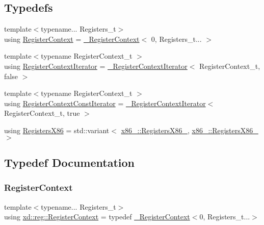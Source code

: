 \subsection*{Typedefs}
\begin{DoxyCompactItemize}
\item 
{\footnotesize template$<$typename... Registers\+\_\+t$>$ }\\using \mbox{\hyperlink{namespacexd_1_1reg_ab6608c02ef554f7a9a48519600fb6707}{Register\+Context}} = \mbox{\hyperlink{classxd_1_1reg_1_1___register_context}{\+\_\+\+Register\+Context}}$<$ 0, Registers\+\_\+t... $>$
\item 
{\footnotesize template$<$typename Register\+Context\+\_\+t $>$ }\\using \mbox{\hyperlink{namespacexd_1_1reg_a6cf4cf0ab5273eb69f6aa3fd40dcc1de}{Register\+Context\+Iterator}} = \mbox{\hyperlink{classxd_1_1reg_1_1___register_context_iterator}{\+\_\+\+Register\+Context\+Iterator}}$<$ Register\+Context\+\_\+t, false $>$
\item 
{\footnotesize template$<$typename Register\+Context\+\_\+t $>$ }\\using \mbox{\hyperlink{namespacexd_1_1reg_a2af91c639cf4f8e0907c20f2ac534965}{Register\+Context\+Const\+Iterator}} = \mbox{\hyperlink{classxd_1_1reg_1_1___register_context_iterator}{\+\_\+\+Register\+Context\+Iterator}}$<$ Register\+Context\+\_\+t, true $>$
\item 
using \mbox{\hyperlink{namespacexd_1_1reg_a0c10a4d10e689bc16f6f1a8feb4fb9b8}{Registers\+X86}} = std\+::variant$<$ \mbox{\hyperlink{namespacexd_1_1reg_1_1x86__32_a28d948c5cde56fbf4f6ea71cea3d595b}{x86\+\_\+::\+Registers\+X86\+\_}}, \mbox{\hyperlink{namespacexd_1_1reg_1_1x86__64_a3a7f77ab982b8a5833111da7ceccafeb}{x86\+\_\+::\+Registers\+X86\+\_}} $>$
\end{DoxyCompactItemize}


\subsection{Typedef Documentation}
\mbox{\label{namespacexd_1_1reg_ab6608c02ef554f7a9a48519600fb6707}} 
\subsubsection{\texorpdfstring{Register\+Context}{RegisterContext}}
{\footnotesize\ttfamily template$<$typename... Registers\+\_\+t$>$ \\
using \mbox{\hyperlink{namespacexd_1_1reg_ab6608c02ef554f7a9a48519600fb6707}{xd\+::reg\+::\+Register\+Context}} = typedef \mbox{\hyperlink{classxd_1_1reg_1_1___register_context}{\+\_\+\+Register\+Context}}$<$0, Registers\+\_\+t...$>$}

